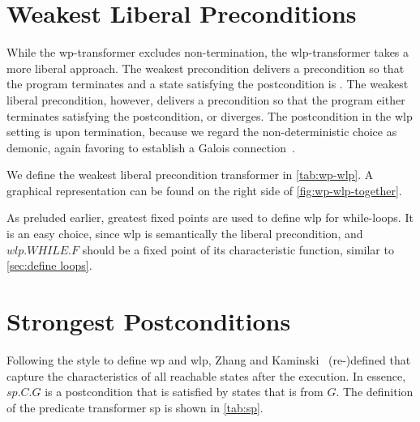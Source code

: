 











\section{Weakest Liberal Preconditions}\label{sec:wlp}
While the wp-transformer excludes non-termination, the wlp-transformer takes a more liberal approach. 
The weakest precondition delivers a precondition so that the program terminates and a state satisfying the postcondition is . 
The weakest liberal precondition, however, delivers a precondition so that the program either terminates satisfying the postcondition, or diverges. 
The postcondition in the wlp setting is  upon termination, because we regard the non-deterministic choice as demonic, again favoring to establish a Galois connection~\cite{zhang22}. 

We define the weakest liberal precondition transformer in \autoref{tab:wp-wlp}. 
A graphical representation can be found on the right side of \autoref{fig:wp-wlp-together}. 

As preluded earlier, greatest fixed points are used to define wlp for while-loops. 
It is an easy choice, since wlp is semantically the  liberal precondition, and $wlp.WHILE.F$ should be a fixed point of its characteristic function, similar to \autoref{sec:define loops}. 






\section{Strongest Postconditions}\label{sec:sp}
Following the style to define wp and wlp, Zhang and Kaminski~\cite{zhang22} (re-)defined  that capture the characteristics of all reachable states after the execution. 
In essence, $sp.C.G$ is a postcondition that is satisfied by  states that is  from $G$. 
The definition of the predicate transformer sp is shown in \autoref{tab:sp}. 


